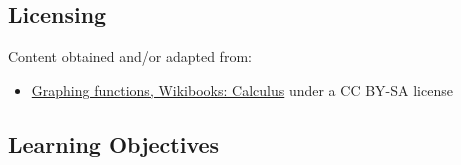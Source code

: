 \subsection{Licensing}
\label{sss:lice-73527}




Content obtained and/or adapted from:



\begin{itemize}
    \item \href{https://en.wikibooks.org/wiki/Calculus/Graphing_functions}{Graphing functions, Wikibooks: Calculus} under a CC BY-SA license
\end{itemize}


\subsection{Learning Objectives}
\label{ssec:lear-fe6e}


